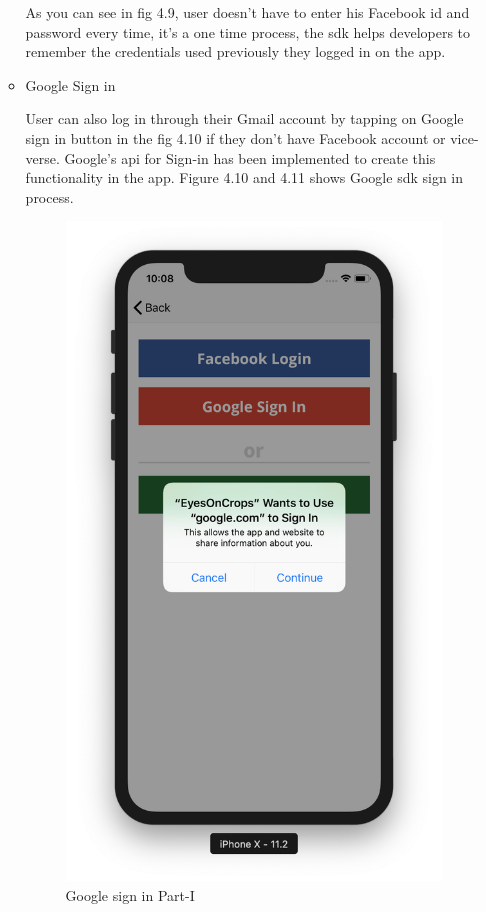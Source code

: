 \begin{itemize}
\begin{itemize}
        As you can see in fig 4.9, user doesn't have to enter his Facebook id and password every time, it's a one time process, the \gls{sdk} helps developers to remember the credentials used previously they logged in on the app.
        
      
        \item Google Sign in
        
        User can also log in through their Gmail account by tapping on Google sign in button in the fig 4.10 if they don't have Facebook account or vice-verse. Google's \gls{api} for Sign-in has been implemented to create this functionality in the app. Figure 4.10 and 4.11 shows Google \gls{sdk} sign in process. \\
        
        \begin{figure}[!htb]
        \begin{minipage}{0.5\textwidth}
            \centering
            \includegraphics[width=0.5\linewidth]{figures/ch4/google_1.png}
            \caption{Google sign in Part-I}\label{Fig:google_part_1}
        \end{minipage}\hfill
        \begin{minipage}{0.5\textwidth}
            \centering

\end{minipage}
\end{figure}
\end{itemize}
\end{itemize}
